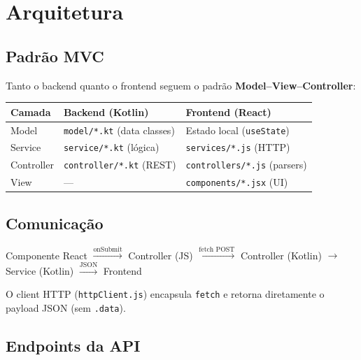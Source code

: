 \documentclass[12pt,a4paper]{article}
\begin{document}
\section{Arquitetura}

\subsection{Padrão MVC}

Tanto o backend quanto o frontend seguem o padrão \textbf{Model--View--Controller}:

\begin{center}
\begin{tabular}{lll}
  \toprule
  \textbf{Camada} & \textbf{Backend (Kotlin)} & \textbf{Frontend (React)} \\
  \midrule
  Model      & \texttt{model/*.kt} (data classes)    & Estado local (\texttt{useState}) \\
  Service    & \texttt{service/*.kt} (lógica)         & \texttt{services/*.js} (HTTP) \\
  Controller & \texttt{controller/*.kt} (REST)        & \texttt{controllers/*.js} (parsers) \\
  View       & ---                                    & \texttt{components/*.jsx} (UI) \\
  \bottomrule
\end{tabular}
\end{center}

\subsection{Comunicação}

\begin{tcolorbox}[colback=codebg,coltext=codetext,colframe=gray!40,title=Fluxo de uma requisição]
\ttfamily\small
Componente React $\xrightarrow{\text{onSubmit}}$ Controller (JS)
$\xrightarrow{\text{fetch POST}}$ Controller (Kotlin)
$\xrightarrow{}$ Service (Kotlin) $\xrightarrow{\text{JSON}}$ Frontend
\end{tcolorbox}

O client HTTP (\texttt{httpClient.js}) encapsula \texttt{fetch} e retorna diretamente o payload JSON (sem \texttt{.data}).

\subsection{Endpoints da API}
\end{document}
